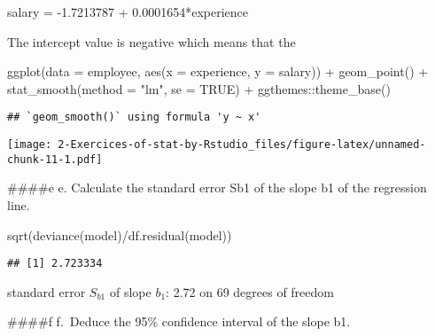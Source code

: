 \documentclass[
]{article}
\newenvironment{Shaded}{\begin{snugshade}}{\end{snugshade}}
\newcommand{\AttributeTok}[1]{\textcolor[rgb]{0.77,0.63,0.00}{#1}}
\newcommand{\ConstantTok}[1]{\textcolor[rgb]{0.00,0.00,0.00}{#1}}
\newcommand{\FloatTok}[1]{\textcolor[rgb]{0.00,0.00,0.81}{#1}}
\newcommand{\FunctionTok}[1]{\textcolor[rgb]{0.00,0.00,0.00}{#1}}
\newcommand{\NormalTok}[1]{#1}
\newcommand{\SpecialCharTok}[1]{\textcolor[rgb]{0.00,0.00,0.00}{#1}}
\newcommand{\StringTok}[1]{\textcolor[rgb]{0.31,0.60,0.02}{#1}}
\begin{document}
salary = -1.7213787 + 0.0001654*experience

The intercept value is negative which means that the

\begin{Shaded}
\begin{Highlighting}[]
\FunctionTok{ggplot}\NormalTok{(}\AttributeTok{data =}\NormalTok{ employee, }\FunctionTok{aes}\NormalTok{(}\AttributeTok{x =}\NormalTok{ experience, }\AttributeTok{y =}\NormalTok{ salary)) }\SpecialCharTok{+} \FunctionTok{geom\_point}\NormalTok{() }\SpecialCharTok{+} \FunctionTok{stat\_smooth}\NormalTok{(}\AttributeTok{method =} \StringTok{"lm"}\NormalTok{, }\AttributeTok{se =} \ConstantTok{TRUE}\NormalTok{) }\SpecialCharTok{+}
\NormalTok{ ggthemes}\SpecialCharTok{::}\FunctionTok{theme\_base}\NormalTok{()}
\end{Highlighting}
\end{Shaded}

\begin{verbatim}
## `geom_smooth()` using formula 'y ~ x'
\end{verbatim}

\texttt{[image: 2-Exercices-of-stat-by-Rstudio\_files/figure-latex/unnamed-chunk-11-1.pdf]}

\#\#\#\#e e. Calculate the standard error Sb1 of the slope b1 of the
regression line.

\begin{Shaded}
\begin{Highlighting}[]
\FunctionTok{sqrt}\NormalTok{(}\FunctionTok{deviance}\NormalTok{(model)}\SpecialCharTok{/}\FunctionTok{df.residual}\NormalTok{(model))}
\end{Highlighting}
\end{Shaded}

\begin{verbatim}
## [1] 2.723334
\end{verbatim}

standard error \(S_{b1}\) of slope \(b_1\): 2.72 on 69 degrees of
freedom

\#\#\#\#f f.~Deduce the 95\% confidence interval of the slope b1.

\begin{Shaded}
\end{Shaded}
\end{document}
